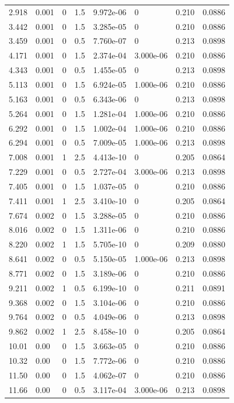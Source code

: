 \documentclass[preview]{standalone}
\begin{document}
{{\begin{tabular}{L{1.2cm}C{1.2cm} C{0.3cm}C{0.5cm} C{1.4cm}C{1.4cm} C{1.4cm}C{1.4cm}}
  2.918  &  0.001  & 0     & 1.5 &  9.972e-06  & 0  & 0.210 &  0.0886   \\ 
  3.442  &  0.001  & 0     & 1.5 &  3.285e-05  & 0  & 0.210 &  0.0886   \\ 
  3.459  &  0.001  & 0     & 0.5 &  7.760e-07  & 0  & 0.213 &  0.0898   \\ 
  4.171  &  0.001  & 0     & 1.5 &  2.374e-04  & 3.000e-06  & 0.210 &  0.0886   \\ 
  4.343  &  0.001  & 0     & 0.5 &  1.455e-05  & 0  & 0.213 &  0.0898   \\ 
  5.113  &  0.001  & 0     & 1.5 &  6.924e-05  & 1.000e-06  & 0.210 &  0.0886   \\ 
  5.163  &  0.001  & 0     & 0.5 &  6.343e-06  & 0  & 0.213 &  0.0898   \\ 
  5.264  &  0.001  & 0     & 1.5 &  1.281e-04  & 1.000e-06  & 0.210 &  0.0886   \\ 
  6.292  &  0.001  & 0     & 1.5 &  1.002e-04  & 1.000e-06  & 0.210 &  0.0886   \\ 
  6.294  &  0.001  & 0     & 0.5 &  7.009e-05  & 1.000e-06  & 0.213 &  0.0898   \\ 
  7.008  &  0.001  & 1     & 2.5 &  4.413e-10  & 0  & 0.205 &  0.0864   \\ 
  7.229  &  0.001  & 0     & 0.5 &  2.727e-04  & 3.000e-06  & 0.213 &  0.0898   \\ 
  7.405  &  0.001  & 0     & 1.5 &  1.037e-05  & 0  & 0.210 &  0.0886   \\ 
  7.411  &  0.001  & 1     & 2.5 &  3.410e-10  & 0  & 0.205 &  0.0864   \\ 
  7.674  &  0.002  & 0     & 1.5 &  3.288e-05  & 0  & 0.210 &  0.0886   \\ 
  8.016  &  0.002  & 0     & 1.5 &  1.311e-06  & 0  & 0.210 &  0.0886   \\ 
  8.220  &  0.002  & 1     & 1.5 &  5.705e-10  & 0  & 0.209 &  0.0880   \\ 
  8.641  &  0.002  & 0     & 0.5 &  5.150e-05  & 1.000e-06  & 0.213 &  0.0898   \\ 
  8.771  &  0.002  & 0     & 1.5 &  3.189e-06  & 0  & 0.210 &  0.0886   \\ 
  9.211  &  0.002  & 1     & 0.5 &  6.199e-10  & 0  & 0.211 &  0.0891   \\ 
  9.368  &  0.002  & 0     & 1.5 &  3.104e-06  & 0  & 0.210 &  0.0886   \\ 
  9.764  &  0.002  & 0     & 0.5 &  4.049e-06  & 0  & 0.213 &  0.0898   \\ 
  9.862  &  0.002  & 1     & 2.5 &  8.458e-10  & 0  & 0.205 &  0.0864   \\ 
  10.01  &  0.00  & 0     & 1.5 &  3.663e-05  & 0  & 0.210 &  0.0886   \\ 
  10.32  &  0.00  & 0     & 1.5 &  7.772e-06  & 0  & 0.210 &  0.0886   \\ 
  11.50  &  0.00  & 0     & 1.5 &  4.062e-07  & 0  & 0.210 &  0.0886   \\ 
  11.66  &  0.00  & 0     & 0.5 &  3.117e-04  & 3.000e-06  & 0.213 &  0.0898   \\ 
\hline 
\end{tabular} 

}}
\end{document}
